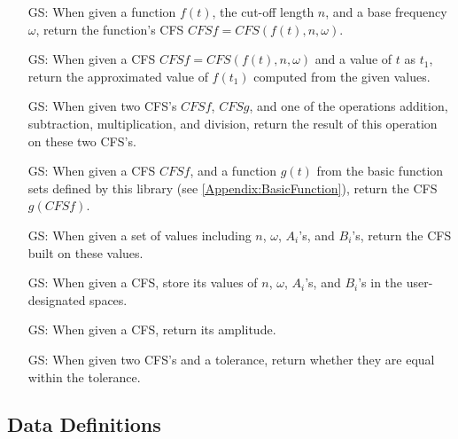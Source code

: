 \documentclass[12pt]{article}
\newcounter{goalnum} %
\begin{document}
\begin{itemize}
	
	\item[GS\refstepcounter{goalnum}\thegoalnum \label{GS:ConvertFromFunc}:] 
	When given a function $f(t)$, the cut-off length $n$, and a base frequency 
	$\omega$, return the function's CFS $\mathit{CFSf}=\mathit{CFS}(f(t), n, \omega)$.
	\item[GS\refstepcounter{goalnum}\thegoalnum \label{GS:FuncValue}:] 
	When given a CFS $\mathit{CFSf}=\mathit{CFS}(f(t), n, \omega)$ and a value of $t$ as $t_1$, 
	return the approximated value of $f(t_1)$ computed from the given values.
	\item[GS\refstepcounter{goalnum}\thegoalnum \label{GS:Operation}:] 
	When given two CFS's $\mathit{CFSf}$, $\mathit{CFSg}$, and one of the 
	operations addition, subtraction, multiplication, and division, return 
	the result of this operation on these two CFS's.
	\item[GS\refstepcounter{goalnum}\thegoalnum \label{GS:Function}:] 
	When given a CFS $\mathit{CFSf}$, and a function $g(t)$ from the basic 
	function sets defined by this library (see \autoref{Appendix:BasicFunction}), return the CFS $g(CFSf)$. 
	 
	\item[GS\refstepcounter{goalnum}\thegoalnum \label{GS:ConvertFromOther}:] 
	When given a set of values including $n$, $\omega$, $A_i$'s, and $B_i$'s, 
	return the CFS built on these values.
	\item[GS\refstepcounter{goalnum}\thegoalnum \label{GS:ConvertToOther}:] 
	When given a CFS, store its values of $n$, $\omega$, $A_i$'s, and $B_i$'s 
	in the user-designated spaces.
	\item[GS\refstepcounter{goalnum}\thegoalnum \label{GS:Amp}:] When given 
	a CFS, return its amplitude.
	\item[GS\refstepcounter{goalnum}\thegoalnum \label{GS:ToleratedEquality}:] 
	When given two CFS's and a tolerance, return whether they are equal 
	within the tolerance.
\end{itemize}

\subsection{Data Definitions} \label{sec_datadef}
\end{document}
